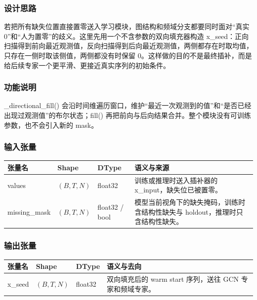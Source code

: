 \documentclass[11pt,a4paper]{ctexart}
\newcommand{\code}[1]{{\ttfamily\small #1}}
\begin{document}
\subsubsection{设计思路}

若把所有缺失位置直接置零送入学习模块，图结构和频域分支都要同时面对“真实 0”和“人为置零”的歧义。这里先用一个不含参数的双向填充器构造 \code{x\_seed}：正向扫描得到前向最近观测值，反向扫描得到后向最近观测值，两侧都存在时取均值，只存在一侧时取该侧值，两侧都没有时保留 0。这样做的目的不是最终插补，而是给后续专家一个更平滑、更接近真实序列的初始条件。

\subsubsection{功能说明}

\code{\_directional\_fill()} 会沿时间维遍历窗口，维护“最近一次观测到的值”和“是否已经出现过观测值”的布尔状态；\code{fill()} 再把前向与后向结果合并。整个模块没有可训练参数，也不会引入新的 mask。

\subsubsection{输入张量}

\begin{tabularx}{\textwidth}{@{}L{3.6cm}L{2.3cm}L{1.5cm}Y@{}}
\toprule
张量名 & Shape & DType & 语义与来源 \\
\midrule
\code{values} & $(B,T,N)$ & \code{float32} & 训练或推理时送入插补器的 \code{x\_input}，缺失位已被置零。 \\
\code{missing\_mask} & $(B,T,N)$ & \code{float32} / \code{bool} & 模型当前视角下的缺失掩码，训练时含结构性缺失与 holdout，推理时只含结构性缺失。 \\
\bottomrule
\end{tabularx}

\subsubsection{输出张量}

\begin{tabularx}{\textwidth}{@{}L{3.6cm}L{2.3cm}L{1.5cm}Y@{}}
\toprule
张量名 & Shape & DType & 语义与去向 \\
\midrule
\code{x\_seed} & $(B,T,N)$ & \code{float32} & 双向填充后的 warm start 序列，送往 GCN 专家和频域专家。 \\
\bottomrule
\end{tabularx}
\end{document}

